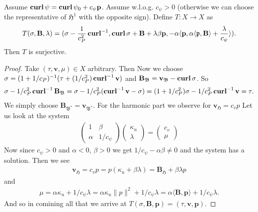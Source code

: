 \documentclass[../master_thesis.tex]{subfiles}
\begin{document}
\begin{lemma}
    Assume $\veccurl \psi = \veccurl \psi_0 + c_\psi \mathbf{p}$. Assume w.l.o.g. $c_\psi >0$
    (otherwise we can choose the representative of $\mathfrak{H}^1$ with the opposite sign).
    Define $T:X \rightarrow X$ as 
    \begin{align*}
        T(\sigma, \mathbf{B},\lambda)
        = (\sigma - \frac{1}{c_P^2}\veccurl^{-1}, \veccurl \sigma + \mathbf{B} + \lambda \beta \mathbf{p},
            -\alpha \langle \mathbf{p}, \alpha \langle \mathfrak{p}, \mathbf{B} \rangle  
            + \frac{\lambda}{c_\psi} \rangle).
    \end{align*}
    Then $T$ is surjective. 
\end{lemma}
\begin{proof}
    Take $(\tau, \mathbf{v},\mu) \in X$ arbitrary. Then 
    Now we choose $\sigma = (1+1/c_P)^{-1} (\tau + (1/c_P^2) \veccurl^{-1} \mathbf{v})$ 
    and $\mathbf{B}_\mathfrak{B} = \mathbf{v}_\mathfrak{B} - \veccurl \sigma$. 
    So 
    \begin{align*}
        \sigma -  1/c_P^2 \veccurl^{-1}\mathbf{B}_\mathfrak{B} 
        = \sigma -  1/c_P^2 (\veccurl^{-1} \mathbf{v} - \sigma)
        = (1+1/c_P^2)\sigma - 1/c_P^2 \veccurl^{-1} \mathbf{v}
        = \tau.
    \end{align*}
    We simply choose $\mathbf{B}_\mathfrak{B^*} = \mathbf{v}_\mathfrak{B^*}$.
    For the harmonic part we observe for $\mathbf{v}_\mathfrak{H} = c_v p$
    Let us look at the system 
    \begin{align*}
        \begin{pmatrix}
            1 & \beta 
            \\ \alpha & 1/c_\psi
        \end{pmatrix}
        \begin{pmatrix}
            \kappa_u 
            \\ \lambda 
        \end{pmatrix}
        = 
        \begin{pmatrix}
            c_v 
            \\ \mu
        \end{pmatrix}
    \end{align*}
    Now since $c_\psi > 0$ and $\alpha < 0$, $\beta > 0$ we get 
    $1/c_\psi - \alpha \beta \neq 0$ and the system has a solution. 
    Then we see 
    \begin{align*}
        \mathbf{v}_\mathfrak{H} = c_v p = p(\kappa_u + \beta \lambda) 
        =  \mathbf{B}_\mathfrak{H} + \beta \lambda p
    \end{align*}
    and 
    \begin{align*}
        \mu = \alpha \kappa_u + 1/c_\psi \lambda
        = \alpha \kappa_u \lVert p \rVert^2 + 1/c_\psi \lambda 
        = \alpha \langle \mathbf{B}, \mathbf{p} \rangle + 1/c_\psi \lambda.
    \end{align*}
    And so in comining all that we arrive at 
    $T(\sigma,\mathbf{B}, \mathbf{p}) = (\tau, \mathbf{v}, \mathbf{p})$.
\end{proof}
\end{document}
